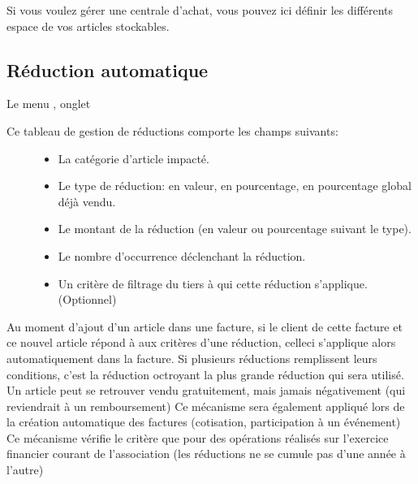 \documentclass[a4paper,10pt,oneside,french]{sphinxmanual}
\begin{document}
\sphinxAtStartPar
Si vous voulez gérer une centrale d’achat, vous pouvez ici définir les différents espace de vos articles stockables.


\subsection{Réduction automatique}
\label{\detokenize{invoice/configuration:reduction-automatique}}
\sphinxAtStartPar
Le menu , onglet 
\begin{description}
\item[{Ce tableau de gestion de réductions comporte les champs suivants:}] \leavevmode\begin{itemize}
\item {} 
\sphinxAtStartPar
La catégorie d’article impacté.

\item {} 
\sphinxAtStartPar
Le type de réduction: en valeur, en pourcentage, en pourcentage global déjà vendu.

\item {} 
\sphinxAtStartPar
Le montant de la réduction (en valeur ou pourcentage suivant le type).

\item {} 
\sphinxAtStartPar
Le nombre d’occurrence déclenchant la réduction.

\item {} 
\sphinxAtStartPar
Un critère de filtrage du tiers à qui cette réduction s’applique. (Optionnel)

\end{itemize}

\end{description}

\sphinxAtStartPar
Au moment d’ajout d’un article dans une facture, si le client de cette facture et ce nouvel article répond à aux critères d’une réduction,
celle\sphinxhyphen{}ci s’applique alors automatiquement dans la facture.
Si plusieurs réductions remplissent leurs conditions, c’est la réduction octroyant la plus grande réduction qui sera utilisé.
Un article peut se retrouver vendu gratuitement, mais jamais négativement (qui reviendrait à un remboursement)
Ce mécanisme sera également appliqué lors de la création automatique des factures (cotisation, participation à un événement)
Ce mécanisme vérifie le critère que pour des opérations réalisés sur l’exercice financier courant de l’association (les réductions ne se cumule pas d’une année à l’autre)
\end{document}
